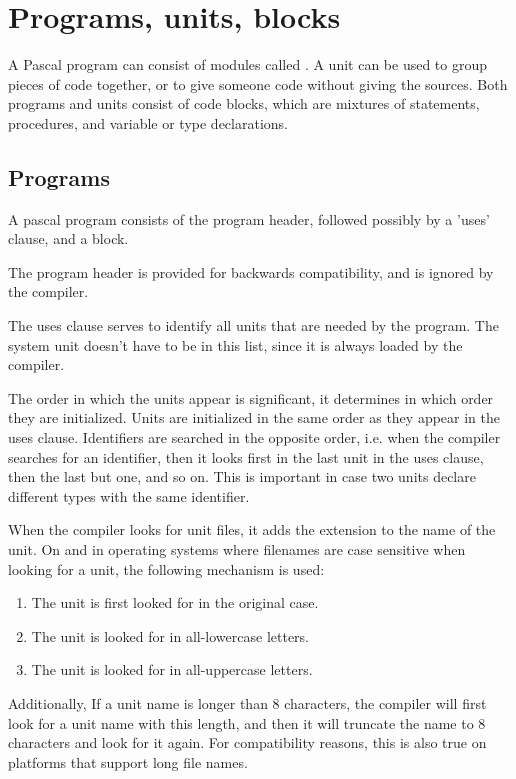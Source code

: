 
\chapter{Programs, units, blocks}
A Pascal program can consist of modules called . A unit can be used
to group pieces of code together, or to give someone code without giving
the sources.
Both programs and units consist of code blocks, which are mixtures of
statements, procedures, and variable or type declarations.

\section{Programs}
A pascal program consists of the program header, followed possibly by a
'uses' clause, and a block.

The program header is provided for backwards compatibility, and is ignored
by the compiler.

The uses clause serves to identify all units that are needed by the program.
The system unit doesn't have to be in this list, since it is always loaded
by the compiler.

The order in which the units appear is significant, it determines in
which order they are initialized. Units are initialized in the same order
as they appear in the uses clause. Identifiers are searched in the opposite
order, i.e. when the compiler searches for an identifier, then it looks
first in the last unit in the uses clause, then the last but one, and so on.
This is important in case two units declare different types with the same
identifier.

When the compiler looks for unit files, it adds the extension 
to the name of the unit. On \linux and in operating systems where filenames 
are case sensitive  when looking for a unit, the following mechanism is
used:
\begin{enumerate}
\item The unit is first looked for in the original case.
\item The unit is looked for in all-lowercase letters.
\item The unit is looked for in all-uppercase letters.
\end{enumerate}
Additionally, If a unit name is longer than 8 characters, the compiler 
will first look for a unit name with this length, and then it will 
truncate the name to 8 characters and look for it again. 
For compatibility reasons, this is also true on platforms that 
support long file names.

